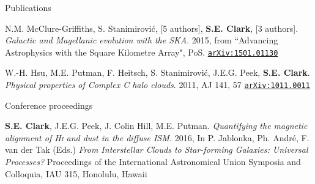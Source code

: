 \documentclass{resume_clark} %
\begin{document}
\begin{rSection}{Publications}
\begin{etaremune}
\item N.M. McClure-Griffiths, S. Stanimirovi\' c, [5 authors], {\bf S.E. Clark}, [3 authors]. \textit{Galactic and Magellanic evolution with the SKA}. 2015, from ``Advancing Astrophysics with the Square Kilometre Array", PoS. \href{http://arxiv.org/abs/1501.01130}{\tt arXiv:1501.01130}

\item W.-H. Hsu, M.E. Putman, F. Heitsch, S. Stanimirovi\' c, J.E.G. Peek, {\bf S.E. Clark}. {\em Physical properties of Complex C halo clouds}. 2011, {AJ 141, 57} \href{https://arxiv.org/abs/1011.0011}{\tt arXiv:1011.0011}
\end{etaremune}

Conference proceedings

\begin{etaremune}
\item {\bf S.E. Clark}, J.E.G. Peek, J. Colin Hill, M.E. Putman. \textit{Quantifying the magnetic alignment of {\textit{\textsc{Hi}}} and dust in the diffuse ISM.} 2016, In P. Jablonka, Ph. Andr\'e, F. van der Tak (Eds.) {\it From Interstellar Clouds to Star-forming Galaxies: Universal Processes?} Proceedings of the International Astronomical Union Symposia and Colloquia, IAU 315, Honolulu, Hawaii
\end{etaremune}

\end{rSection}
\end{document}
